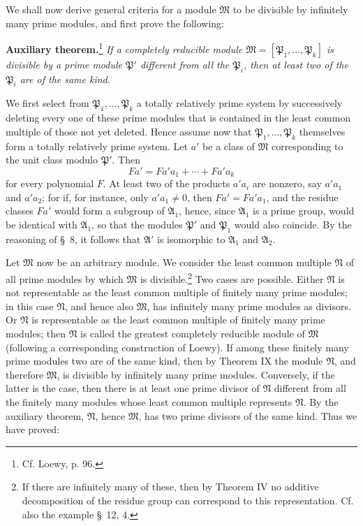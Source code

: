 \documentclass[11pt]{article}
\begin{document}
We shall now derive general criteria for a module $\mathfrak M$ to be divisible by infinitely many prime modules, and first prove the following:

\textbf{Auxiliary theorem.}\footnote{Cf. Loewy, p. 96.} \emph{If a completely reducible module $\mathfrak M=[\mathfrak P_1,
\ldots,
\mathfrak P_k]$ is divisible by a prime module $\mathfrak P'$ different from all the $\mathfrak P_i$, then at least two of the $\mathfrak P_i$ are of the same kind.}

We first select from $\mathfrak P_1,
\ldots,
\mathfrak P_k$ a totally relatively prime system by successively deleting every one of these prime modules that is contained in the least common multiple of those not yet deleted. Hence assume now that $\mathfrak P_1,
\ldots,
\mathfrak P_k$ themselves form a totally relatively prime system. Let $a'$ be a class of $\mathfrak M$ corresponding to the unit class modulo $\mathfrak P'$. Then
\[
 Fa'=Fa'a_1+
\cdots+Fa'a_k
\]
for every polynomial $F$. At least two of the products $a'a_i$ are nonzero, say $a'a_1$ and $a'a_2$; for if, for instance, only $a'a_1\ne0$, then $Fa'=Fa'a_1$, and the residue classes $Fa'$ would form a subgroup of $\mathfrak A_1$, hence, since $\mathfrak A_1$ is a prime group, would be identical with $\mathfrak A_1$, so that the modules $\mathfrak P'$ and $\mathfrak P_1$ would also coincide. By the reasoning of \S~8, it follows that $\mathfrak A'$ is isomorphic to $\mathfrak A_1$ and $\mathfrak A_2$.

Let $\mathfrak M$ now be an arbitrary module. We consider the least common multiple $\mathfrak N$ of all prime modules by which $\mathfrak M$ is divisible.\footnote{If there are infinitely many of these, then by Theorem IV no additive decomposition of the residue group can correspond to this representation. Cf. also the example \S~12, 4.} Two cases are possible. Either $\mathfrak N$ is not representable as the least common multiple of finitely many prime modules; in this case $\mathfrak N$, and hence also $\mathfrak M$, has infinitely many prime modules as divisors. Or $\mathfrak N$ is representable as the least common multiple of finitely many prime modules; then $\mathfrak N$ is called the greatest completely reducible module of $\mathfrak M$ (following a corresponding construction of Loewy). If among these finitely many prime modules two are of the same kind, then by Theorem IX the module $\mathfrak N$, and therefore $\mathfrak M$, is divisible by infinitely many prime modules. Conversely, if the latter is the case, then there is at least one prime divisor of $\mathfrak N$ different from all the finitely many modules whose least common multiple represents $\mathfrak N$. By the auxiliary theorem, $\mathfrak N$, hence $\mathfrak M$, has two prime divisors of the same kind. Thus we have proved:
\end{document}
